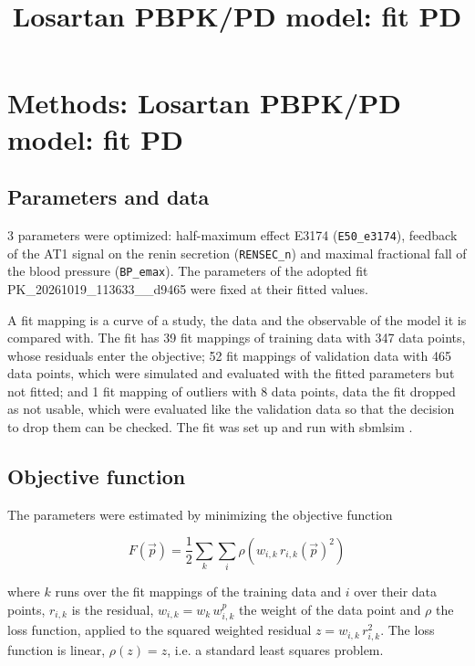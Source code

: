 \documentclass{article}
\title{Losartan PBPK/PD model: fit PD}
\date{}
\begin{document}
\maketitle

\section{Methods: Losartan PBPK/PD model: fit PD}

\subsection{Parameters and data}

3 parameters were optimized: half-maximum effect E3174 (\texttt{E50\_e3174}), feedback of the AT1 signal on the renin secretion (\texttt{RENSEC\_n}) and maximal fractional fall of the blood pressure (\texttt{BP\_emax}). The parameters of the adopted fit PK\_20261019\_113633\_\_d9465 were fixed at their fitted values.

A fit mapping is a curve of a study, the data and the observable of the model it is compared with. The fit has 39 fit mappings of training data with 347 data points, whose residuals enter the objective; 52 fit mappings of validation data with 465 data points, which were simulated and evaluated with the fitted parameters but not fitted; and 1 fit mapping of outliers with 8 data points, data the fit dropped as not usable, which were evaluated like the validation data so that the decision to drop them can be checked. The fit was set up and run with sbmlsim \cite{Koenig2026_sbmlsim}.

\subsection{Objective function}

The parameters were estimated by minimizing the objective function

\begin{equation}
F(\vec{p}) = \frac{1}{2} \sum_{k} \sum_{i} \rho\left(w_{i,k}\, r_{i,k}(\vec{p})^2\right)
\end{equation}

where $k$ runs over the fit mappings of the training data and $i$ over their data points, $r_{i,k}$ is the residual, $w_{i,k} = w_k\, w^{p}_{i,k}$ the weight of the data point and $\rho$ the loss function, applied to the squared weighted residual $z = w_{i,k}\, r_{i,k}^2$. The loss function is linear, $\rho(z) = z$, i.e. a standard least squares problem.
\end{document}
